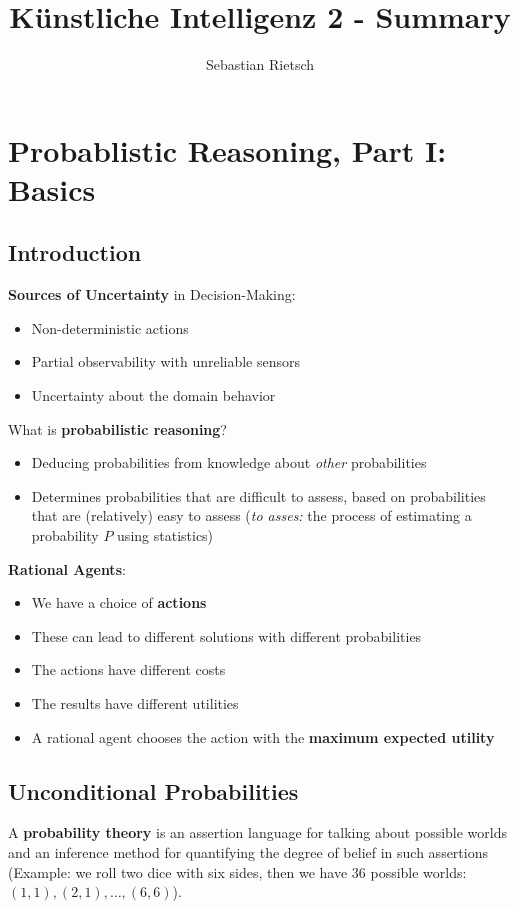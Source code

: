 \documentclass{scrartcl}
\title{Künstliche Intelligenz 2 - Summary}
\author{Sebastian Rietsch}
\begin{document}
\maketitle
\tableofcontents

\section{Probablistic Reasoning, Part I: Basics}
\subsection{Introduction}
\textbf{Sources of Uncertainty} in Decision-Making:
\begin{itemize}
    \item
        Non-deterministic actions
    \item
        Partial observability with unreliable sensors
    \item
        Uncertainty about the domain behavior
\end{itemize}

What is \textbf{probabilistic reasoning}?
\begin{itemize}
    \item
        Deducing probabilities from knowledge about \textit{other} probabilities
    \item
        Determines probabilities that are difficult to assess, based on probabilities that are (relatively) easy to assess (\textit{to asses:} the process of estimating a probability \(P\) using statistics)
\end{itemize}

\textbf{Rational Agents}:
\begin{itemize}
    \item
        We have a choice of \textbf{actions}
    \item
        These can lead to different solutions with different probabilities
    \item
        The actions have different costs
    \item
        The results have different utilities
    \item
        A rational agent chooses the action with the \textbf{maximum expected utility}
\end{itemize}

\subsection{Unconditional Probabilities}
A \textbf{probability theory} is an assertion language for talking about possible worlds and an inference method for quantifying the degree of belief in such assertions (Example: we roll two dice with six sides, then we have 36 possible worlds: \((1,1), (2,1), \dots, (6,6)\)).
\end{document}
